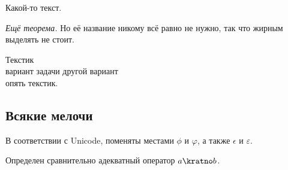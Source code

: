Какой-то текст.

\begin{problems}

\item\emph{Ещё теорема.}
Но её название никому всё равно не нужно, так что жирным выделять не стоит.

\item
Текстик\\
\subproblem вариант задачи
\qquad
\subproblem другой вариант
\\
опять текстик.

\end{problems}


\subsection*{Всякие мелочи}

\begin{problems}

\item
В соответствии с Unicode, поменяты местами $\phi$ и $\varphi$, а также
$\epsilon$ и $\varepsilon$.

\item
Определен сравнительно адекватный оператор $a \kratno b$.

\end{problems}

